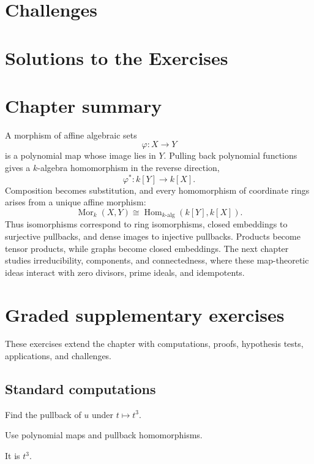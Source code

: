 \section{Challenges}
\label{sec:vi04-challenges}


\ifdefined\IncludeExerciseSolutions
\section{Solutions to the Exercises}
\label{sec:vi04-exercise-solutions}

\fi

\section{Chapter summary}

A morphism of affine algebraic sets
\[
\varphi:X\to Y
\]
is a polynomial map whose image lies in \(Y\).  Pulling back polynomial functions gives a
\(k\)-algebra homomorphism in the reverse direction,
\[
\varphi^\ast:k[Y]\to k[X].
\]
Composition becomes substitution, and every homomorphism of coordinate rings arises from a
unique affine morphism:
\[
\operatorname{Mor}_k(X,Y)
\cong
\operatorname{Hom}_{k\text{-alg}}(k[Y],k[X]).
\]
Thus isomorphisms correspond to ring isomorphisms, closed embeddings to surjective
pullbacks, and dense images to injective pullbacks.  Products become tensor products, while
graphs become closed embeddings.  The next chapter studies irreducibility, components, and
connectedness, where these map-theoretic ideas interact with zero divisors, prime ideals,
and idempotents.
\section{Graded supplementary exercises}
These exercises extend the chapter with computations, proofs, hypothesis tests, applications, and challenges.

\subsection*{Standard computations}

\begin{exercise}[Pullback]\label{exr:vi04-expand-01}
Find the pullback of $u$ under $t\mapsto t^3$.
\end{exercise}
\begin{hint}
Use polynomial maps and pullback homomorphisms.
\end{hint}
\begin{solution}
It is $t^3$.
\end{solution}

